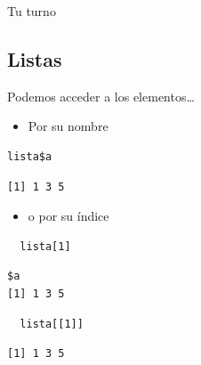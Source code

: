 \documentclass[xcolor={usenames,svgnames,dvipsnames}]{beamer}
\begin{document}
\begin{frame}[label=sec-3-2-3]{Tu turno}
\end{frame}
\subsection{Listas}
\label{sec-3-3}
\begin{frame}[fragile,label=sec-3-3-1]{Podemos acceder a los elementos\ldots{}}
 \begin{itemize}
\item Por su nombre
\end{itemize}
\lstset{language=R,label= ,caption= ,numbers=none}
\begin{lstlisting}
lista$a
\end{lstlisting}

\begin{verbatim}
[1] 1 3 5
\end{verbatim}

\begin{itemize}
\item o por su índice
\end{itemize}
\lstset{language=R,label= ,caption= ,numbers=none}
\begin{lstlisting}
  lista[1]
\end{lstlisting}

\begin{verbatim}
$a
[1] 1 3 5
\end{verbatim}

\lstset{language=R,label= ,caption= ,numbers=none}
\begin{lstlisting}
  lista[[1]]
\end{lstlisting}

\begin{verbatim}
[1] 1 3 5
\end{verbatim}
\end{frame}
\end{document}
